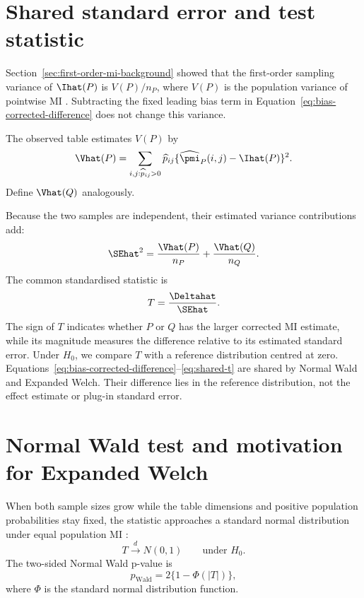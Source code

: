 \section{Shared standard error and test statistic}

Section~\ref{sec:first-order-mi-background} showed that the first-order
sampling variance of \(\Ihat(P)\) is \(V(P)/n_P\), where \(V(P)\) is the
population variance of pointwise MI \citep{moddemeijer1989,brillinger2004}.
Subtracting the fixed leading bias term
in Equation~\eqref{eq:bias-corrected-difference} does not change this
variance.

The observed table estimates \(V(P)\) by
\begin{equation}
  \Vhat(P)
  =\sum_{i,j:\widehat p_{ij}>0}
  \widehat p_{ij}
  \{\widehat\pmi_P(i,j)-\Ihat(P)\}^2.
  \label{eq:estimated-mi-variance}
\end{equation}
Define \(\Vhat(Q)\) analogously.

Because the two samples are independent, their estimated variance
contributions add:
\begin{equation}
  \SEhat^2
  =\frac{\Vhat(P)}{n_P}
  +\frac{\Vhat(Q)}{n_Q}.
  \label{eq:shared-se}
\end{equation}
The common standardised statistic is
\begin{equation}
  T=\frac{\Deltahat}{\SEhat}.
  \label{eq:shared-t}
\end{equation}
The sign of \(T\) indicates whether \(P\) or \(Q\) has the larger
corrected MI estimate, while its magnitude measures the difference
relative to its estimated standard error. Under \(H_0\), we compare \(T\) with a reference distribution
centred at zero.
Equations~\eqref{eq:bias-corrected-difference}--\eqref{eq:shared-t} are shared
by Normal Wald and Expanded Welch. Their difference lies in the reference
distribution, not the effect estimate or plug-in standard error.

\section{Normal Wald test and motivation for Expanded Welch}

When both sample sizes grow while the table dimensions and positive
population probabilities stay fixed, the statistic approaches a standard
normal distribution under equal population MI
\citep{wald1943,vanderVaart1998}:
\begin{equation}
  T\xrightarrow{d}N(0,1)
  \qquad\text{under }H_0.
\end{equation}
The two-sided Normal Wald p-value is
\begin{equation}
  p_{\mathrm{Wald}}
  =2\{1-\Phi(|T|)\},
  \label{eq:wald-pvalue}
\end{equation}
where \(\Phi\) is the standard normal distribution function.

